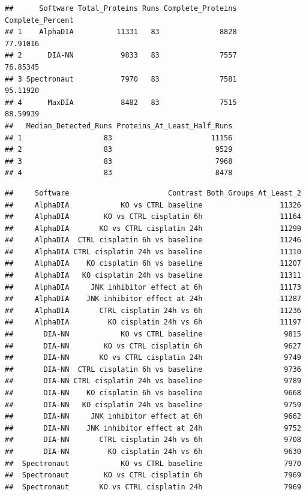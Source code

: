 \documentclass[
  10pt,
]{article}
\begin{document}
\begin{verbatim}
##      Software Total_Proteins Runs Complete_Proteins Complete_Percent
## 1    AlphaDIA          11331   83              8828         77.91016
## 2      DIA-NN           9833   83              7557         76.85345
## 3 Spectronaut           7970   83              7581         95.11920
## 4      MaxDIA           8482   83              7515         88.59939
##   Median_Detected_Runs Proteins_At_Least_Half_Runs
## 1                   83                       11156
## 2                   83                        9529
## 3                   83                        7968
## 4                   83                        8478
\end{verbatim}

\begin{verbatim}
##     Software                       Contrast Both_Groups_At_Least_2
##     AlphaDIA            KO vs CTRL baseline                  11326
##     AlphaDIA        KO vs CTRL cisplatin 6h                  11164
##     AlphaDIA       KO vs CTRL cisplatin 24h                  11299
##     AlphaDIA  CTRL cisplatin 6h vs baseline                  11246
##     AlphaDIA CTRL cisplatin 24h vs baseline                  11310
##     AlphaDIA    KO cisplatin 6h vs baseline                  11207
##     AlphaDIA   KO cisplatin 24h vs baseline                  11311
##     AlphaDIA     JNK inhibitor effect at 6h                  11173
##     AlphaDIA    JNK inhibitor effect at 24h                  11287
##     AlphaDIA       CTRL cisplatin 24h vs 6h                  11236
##     AlphaDIA         KO cisplatin 24h vs 6h                  11197
##       DIA-NN            KO vs CTRL baseline                   9815
##       DIA-NN        KO vs CTRL cisplatin 6h                   9627
##       DIA-NN       KO vs CTRL cisplatin 24h                   9749
##       DIA-NN  CTRL cisplatin 6h vs baseline                   9736
##       DIA-NN CTRL cisplatin 24h vs baseline                   9789
##       DIA-NN    KO cisplatin 6h vs baseline                   9668
##       DIA-NN   KO cisplatin 24h vs baseline                   9759
##       DIA-NN     JNK inhibitor effect at 6h                   9662
##       DIA-NN    JNK inhibitor effect at 24h                   9752
##       DIA-NN       CTRL cisplatin 24h vs 6h                   9708
##       DIA-NN         KO cisplatin 24h vs 6h                   9630
##  Spectronaut            KO vs CTRL baseline                   7970
##  Spectronaut        KO vs CTRL cisplatin 6h                   7969
##  Spectronaut       KO vs CTRL cisplatin 24h                   7969

\end{verbatim}
\end{document}
